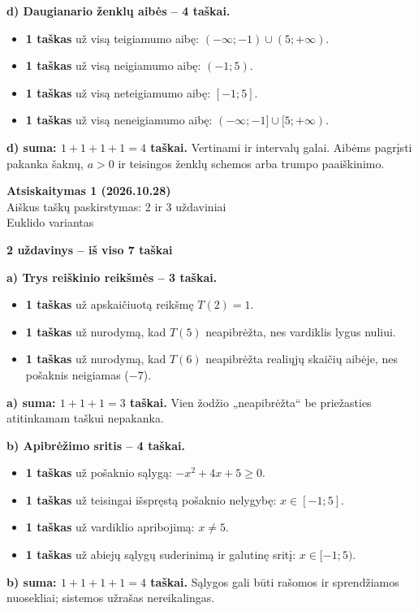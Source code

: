 \documentclass[11pt]{article}
\newcommand{\antraste}[1]{\begin{center}\Large\textbf{Atsiskaitymas 1 (2026.10.28)}\\\large #1\\\normalsize Euklido variantas\end{center}}
\newcommand{\sk}[1]{\par\medskip\textbf{#1}\par}
\begin{document}
\textbf{d) Daugianario ženklų aibės -- 4 taškai.}
\begin{itemize}
\item \textbf{1 taškas} už visą teigiamumo aibę:
$(-\infty;-1)\cup(5;+\infty)$.
\item \textbf{1 taškas} už visą neigiamumo aibę: $(-1;5)$.
\item \textbf{1 taškas} už visą neteigiamumo aibę: $[-1;5]$.
\item \textbf{1 taškas} už visą neneigiamumo aibę:
$(-\infty;-1]\cup[5;+\infty)$.
\end{itemize}
\textbf{d) suma: $1+1+1+1=4$ taškai.} Vertinami ir intervalų galai. Aibėms pagrįsti pakanka šaknų, $a>0$ ir teisingos ženklų schemos arba trumpo paaiškinimo.

\begin{center}\end{center}
\newpage
\antraste{Aiškus taškų paskirstymas: 2 ir 3 uždaviniai}
\sk{2 uždavinys -- iš viso 7 taškai}
\textbf{a) Trys reiškinio reikšmės -- 3 taškai.}
\begin{itemize}
\item \textbf{1 taškas} už apskaičiuotą reikšmę $T(2)=1$.
\item \textbf{1 taškas} už nurodymą, kad $T(5)$ neapibrėžta, nes vardiklis lygus nuliui.
\item \textbf{1 taškas} už nurodymą, kad $T(6)$ neapibrėžta realiųjų skaičių aibėje, nes pošaknis neigiamas ($-7$).
\end{itemize}
\textbf{a) suma: $1+1+1=3$ taškai.} Vien žodžio „neapibrėžta“ be priežasties atitinkamam taškui nepakanka.

\textbf{b) Apibrėžimo sritis -- 4 taškai.}
\begin{itemize}
\item \textbf{1 taškas} už pošaknio sąlygą:
$-x^2+4x+5\ge0$.
\item \textbf{1 taškas} už teisingai išspręstą pošaknio nelygybę:
$x\in[-1;5]$.
\item \textbf{1 taškas} už vardiklio apribojimą: $x\ne5$.
\item \textbf{1 taškas} už abiejų sąlygų suderinimą ir galutinę sritį:
$x\in[-1;5)$.
\end{itemize}
\textbf{b) suma: $1+1+1+1=4$ taškai.} Sąlygos gali būti rašomos ir sprendžiamos nuosekliai; sistemos užrašas nereikalingas.
\end{document}
